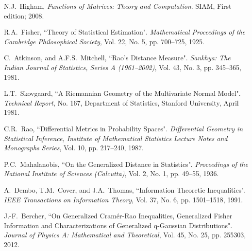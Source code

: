 \documentclass[letterpaper,10pt,twocolumn,conference]{ieeeconf}
\begin{document}
\begin{thebibliography}{99}
N.J.~Higham, \emph{Functions of Matrices: Theory and Computation}. SIAM, First
edition; 2008.


R.A.~Fisher, ``Theory of Statistical Estimation". \emph{Mathematical Proceedings of the Cambridge Philosophical Society}, Vol. 22, No. 5, pp. 700--725, 1925.




C.~Atkinson, and A.F.S.~Mitchell, ``Rao's Distance Measure". \emph{Sankhya: The Indian Journal of Statistics, Series A (1961--2002)}, Vol. 43, No. 3, pp. 345--365, 1981.

L.T.~Skovgaard, ``A Riemannian Geometry of the Multivariate Normal Model". \emph{Technical Report}, No. 167, Department of Statistics, Stanford University, April 1981.

C.R.~Rao, ``Differential Metrics in Probability Spaces". \emph{Differential Geometry in Statistical Inference, Institute of Mathematical Statistics Lecture Notes and Monographs Series}, Vol. 10, pp. 217--240, 1987.

\balance 


P.C.~Mahalanobis, ``On the Generalized Distance in Statistics". \emph{Proceedings
of the National Institute of Sciences (Calcutta)}, Vol. 2, No. 1, pp. 49--55, 1936.



A.~Dembo, T.M.~Cover, and J.A.~Thomas, ``Information Theoretic Inequalities". \emph{IEEE Transactions on Information Theory}, Vol. 37, No. 6, pp. 1501--1518, 1991.

J.-F.~Bercher, ``On Generalized Cram\'{e}r-Rao Inequalities, Generalized Fisher Information and Characterizations of Generalized q-Gaussian Distributions". \emph{Journal of Physics A: Mathematical and Theoretical}, Vol. 45, No. 25, pp. 255303, 2012.



\end{thebibliography}
\end{document}
